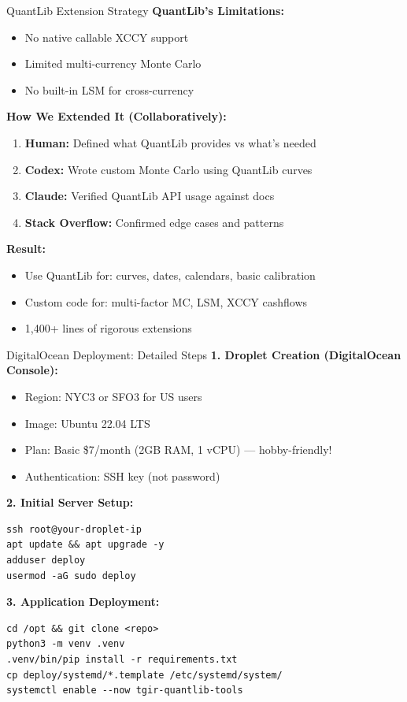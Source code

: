 \documentclass[aspectratio=169,11pt]{beamer}
\begin{document}
\begin{frame}{QuantLib Extension Strategy}
\textbf{QuantLib's Limitations:}
\begin{itemize}
    \item No native callable XCCY support
    \item Limited multi-currency Monte Carlo
    \item No built-in LSM for cross-currency
\end{itemize}

\textbf{How We Extended It (Collaboratively):}
\begin{enumerate}
    \item \textbf{Human:} Defined what QuantLib provides vs what's needed
    \item \textbf{Codex:} Wrote custom Monte Carlo using QuantLib curves
    \item \textbf{Claude:} Verified QuantLib API usage against docs
    \item \textbf{Stack Overflow:} Confirmed edge cases and patterns
\end{enumerate}

\textbf{Result:}
\begin{itemize}
    \item Use QuantLib for: curves, dates, calendars, basic calibration
    \item Custom code for: multi-factor MC, LSM, XCCY cashflows
    \item 1,400+ lines of rigorous extensions
\end{itemize}
\end{frame}

\begin{frame}[fragile]{DigitalOcean Deployment: Detailed Steps}
\textbf{1. Droplet Creation (DigitalOcean Console):}
\begin{itemize}
    \item Region: NYC3 or SFO3 for US users
    \item Image: Ubuntu 22.04 LTS
    \item Plan: Basic \$7/month (2GB RAM, 1 vCPU) --- hobby-friendly!
    \item Authentication: SSH key (not password)
\end{itemize}

\textbf{2. Initial Server Setup:}
\begin{verbatim}
ssh root@your-droplet-ip
apt update && apt upgrade -y
adduser deploy
usermod -aG sudo deploy
\end{verbatim}

\textbf{3. Application Deployment:}
\begin{verbatim}
cd /opt && git clone <repo>
python3 -m venv .venv
.venv/bin/pip install -r requirements.txt
cp deploy/systemd/*.template /etc/systemd/system/
systemctl enable --now tgir-quantlib-tools
\end{verbatim}
\end{frame}
\end{document}
